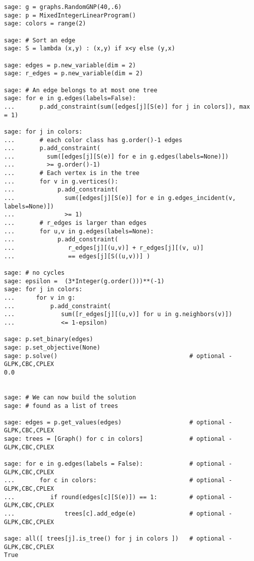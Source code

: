 \begin{lstlisting}
sage: g = graphs.RandomGNP(40,.6)
sage: p = MixedIntegerLinearProgram()
sage: colors = range(2)

sage: # Sort an edge
sage: S = lambda (x,y) : (x,y) if x<y else (y,x)

sage: edges = p.new_variable(dim = 2)
sage: r_edges = p.new_variable(dim = 2)

sage: # An edge belongs to at most one tree
sage: for e in g.edges(labels=False):
...       p.add_constraint(sum([edges[j][S(e)] for j in colors]), max = 1)

sage: for j in colors:
...       # each color class has g.order()-1 edges
...       p.add_constraint(
...         sum([edges[j][S(e)] for e in g.edges(labels=None)])
...         >= g.order()-1)
...       # Each vertex is in the tree
...       for v in g.vertices():
...            p.add_constraint(
...              sum([edges[j][S(e)] for e in g.edges_incident(v, labels=None)])
...              >= 1)
...       # r_edges is larger than edges
...       for u,v in g.edges(labels=None):
...            p.add_constraint(
...               r_edges[j][(u,v)] + r_edges[j][(v, u)]
...               == edges[j][S((u,v))] )

sage: # no cycles
sage: epsilon =  (3*Integer(g.order()))**(-1)
sage: for j in colors:
...      for v in g:
...          p.add_constraint(
...             sum([r_edges[j][(u,v)] for u in g.neighbors(v)])
...             <= 1-epsilon)

sage: p.set_binary(edges)
sage: p.set_objective(None)
sage: p.solve()                                     # optional - GLPK,CBC,CPLEX
0.0


sage: # We can now build the solution
sage: # found as a list of trees

sage: edges = p.get_values(edges)                   # optional - GLPK,CBC,CPLEX
sage: trees = [Graph() for c in colors]             # optional - GLPK,CBC,CPLEX

sage: for e in g.edges(labels = False):             # optional - GLPK,CBC,CPLEX
...       for c in colors:                          # optional - GLPK,CBC,CPLEX
...          if round(edges[c][S(e)]) == 1:         # optional - GLPK,CBC,CPLEX
...              trees[c].add_edge(e)               # optional - GLPK,CBC,CPLEX

sage: all([ trees[j].is_tree() for j in colors ])   # optional - GLPK,CBC,CPLEX
True
\end{lstlisting}



